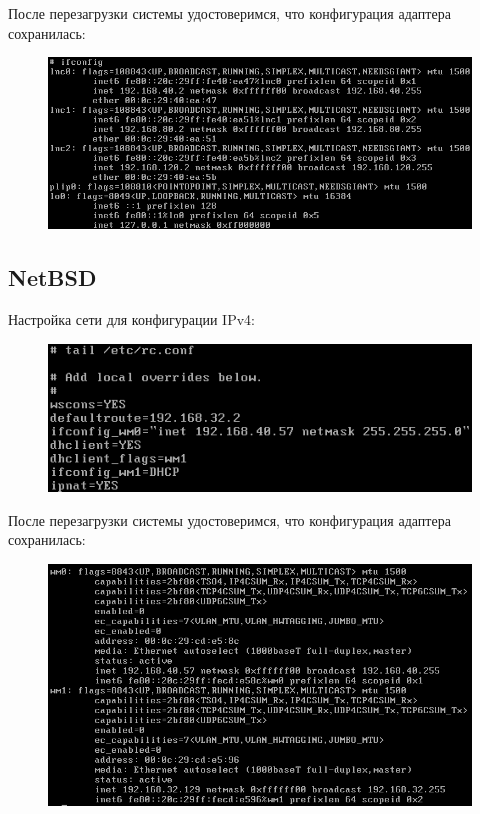 \documentclass[14pt,a4paper,report]{report}
\begin{document}
После перезагрузки системы удостоверимся, что конфигурация адаптера сохранилась:

\begin{figure}[h!]
	\centering
	\includegraphics[scale = 0.95]{images/5_2.png}
	\caption{}
	\label{image:12}
\end{figure}

\clearpage

\subsection{NetBSD}

Настройка сети для конфигурации IPv4:

\begin{figure}[h!]
	\centering
	\includegraphics[scale = 1.2]{images/6_2.png}
	\caption{}
	\label{image:13}
\end{figure}

После перезагрузки системы удостоверимся, что конфигурация адаптера сохранилась:

\begin{figure}[h!]
	\centering
	\includegraphics[scale = 0.9]{images/6_3.png}
	\caption{}
	\label{image:14}
\end{figure}
\end{document}
